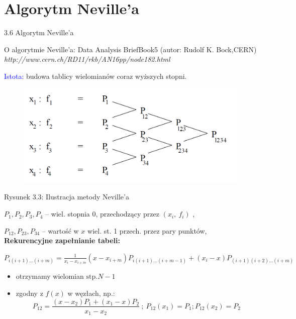\section{Algorytm Neville'a}
\begin{frame}
{3.6 Algorytm Neville'a}

O algorytmie Neville'a: Data Analysis BriefBook5 (autor: Rudolf K. Bock,CERN)
{\it http://www.cern.ch/RD11/rkb/AN16pp/node182.html} \newline

\textcolor{blue}{Istota:} budowa tablicy wielomianów coraz wyższych stopni.
\begin{figure}[h]
			\includegraphics[scale = 0.28]{img/3/interpol_3_6}
	\end{figure}
Rysunek 3.3: Ilustracja metody Neville'a
\end{frame}

\begin{frame}
$P_{1}, P_{2}, P_{3}, P_{4}$ -- wiel. stopnia $0$, przechodzący przez $(x_{i},\ f_{i})$ ,

$P_{12}, P_{23}, P_{34}$ -- wartość w $x$ wiel. st. 1 przech. przez pary punktów, \\
\vspace{4mm}
\textbf{Rekurencyjne zapełnianie tabeli:}

$P_{i(i+1)\ldots(i+m)}=\displaystyle \frac{1}{x_{i}-x_{i+m}}(x-x_{i+m})P_{i(i+1)\ldots(i+m-1)}+(x_{i}-x)P_{(i+1)(i+2)\ldots(i+m)}$

\begin{itemize}
\item otrzymamy wielomian $\mathrm{s}\mathrm{t}\mathrm{p}. N-1$

\item zgodny z $f(x)$ w węzłach, np.:
$$
P_{12}=\frac{(x-x_{2})P_{1}+(x_{1}-x)P_{2}}{x_{1}-x_{2}}\ ;\ P_{12}(x_{1})=P_{1};P_{12}(x_{2})=P_{2}
$$

\end{itemize}

\end{frame}

